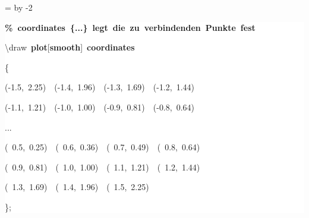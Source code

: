 \begingroup
\ttfamily
{}
=\textwidth
\advance{} by -2\fboxsep
\noindent
\colorbox{background}
{%
\parbox{\dimen255}
{%
\rule[-0.5ex]{0pt}{2.5ex}\hspace*{0.0em}\textcolor{G}{\textbf{\%~coordinates~\{...\}~legt~die~zu~verbindenden~Punkte~fest}}\\
\rule[-0.5ex]{0pt}{2.5ex}\hspace*{0.0em}\textbackslash{}draw~\textcolor{R}{\textbf{plot}}[\textcolor{R}{\textbf{smooth}}]~\textcolor{R}{\textbf{coordinates}}\\
\rule[-0.5ex]{0pt}{2.5ex}\hspace*{0.0em}\{\\
\rule[-0.5ex]{0pt}{2.5ex}\hspace*{1.0em}({-}1.5,~2.25)~~({-}1.4,~1.96)~~({-}1.3,~1.69)~~({-}1.2,~1.44)\\
\rule[-0.5ex]{0pt}{2.5ex}\hspace*{1.0em}({-}1.1,~1.21)~~({-}1.0,~1.00)~~({-}0.9,~0.81)~~({-}0.8,~0.64)\\
\rule[-0.5ex]{0pt}{2.5ex}\hspace*{1.0em}...\\
\rule[-0.5ex]{0pt}{2.5ex}\hspace*{1.0em}(~0.5,~0.25)~~(~0.6,~0.36)~~(~0.7,~0.49)~~(~0.8,~0.64)\\
\rule[-0.5ex]{0pt}{2.5ex}\hspace*{1.0em}(~0.9,~0.81)~~(~1.0,~1.00)~~(~1.1,~1.21)~~(~1.2,~1.44)\\
\rule[-0.5ex]{0pt}{2.5ex}\hspace*{1.0em}(~1.3,~1.69)~~(~1.4,~1.96)~~(~1.5,~2.25)\\
\rule[-0.5ex]{0pt}{2.5ex}\hspace*{0.0em}\};}%
}%
\endgroup

